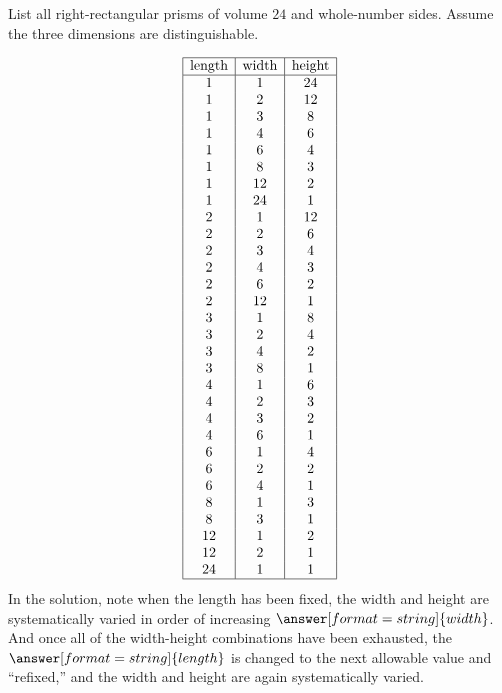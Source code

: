 \documentclass[nooutcomes]{ximera}
\begin{document}
\newpage
\begin{problem}
List all right-rectangular prisms of volume $24$ and whole-number sides.  Assume the three dimensions are distinguishable. 
\begin{solution}
\[
\begin{array}{|c|c|c|}
\hline
\text{length} & \text{width} & \text{height} \\ 
\hline
1 & 1 & 24 \\
1 & 2 & 12 \\
1 & 3 & 8 \\
1 & 4 & 6 \\
1 & 6 & 4 \\
1 & 8 & 3 \\
1 & 12 & 2 \\
1 & 24 & 1 \\
2 & 1 & 12 \\
2 & 2 & 6 \\
2 & 3 & 4 \\
2 & 4 & 3 \\
2 & 6 & 2 \\
2 & 12 & 1 \\
3 & 1 & 8 \\
3 & 2 & 4 \\
3 & 4 & 2 \\
3 & 8 & 1 \\
4 & 1 & 6 \\
4 & 2 & 3 \\
4 & 3 & 2 \\
4 & 6 & 1 \\
6 & 1 & 4 \\
6 & 2 & 2 \\
6 & 4 & 1 \\
8 & 1 & 3 \\
8 & 3 & 1 \\
12 & 1 & 2 \\
12 & 2 & 1 \\
24 & 1 & 1 \\
\hline
\end{array}
\]
In the solution, note when the length has been fixed, the width and height are systematically varied in order of increasing $\answer[format=string]{width}$. And once all of the width-height combinations have been exhausted, the 
$\answer[format=string]{length}$ is changed to the next allowable value and ``refixed,'' and the width and height are again systematically varied.  
\end{solution}
\end{problem}
\end{document}
